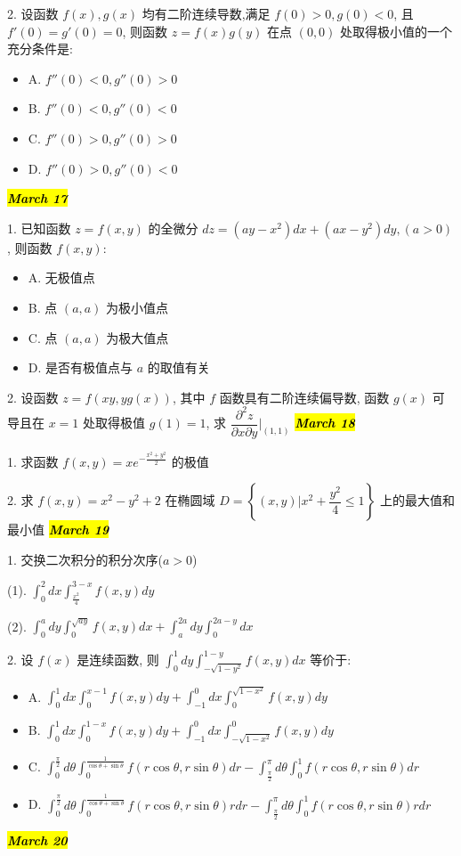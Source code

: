 2. 设函数 $f(x),g(x)$ 均有二阶连续导数,满足 $f(0)>0,g(0)<0$, 且 $f'(0)=g'(0)=0$, 则函数 $z=f(x)g(y)$ 在点 $(0,0)$ 处取得极小值的一个充分条件是:
\begin{itemize}
	\item A. $f''(0)<0,g''(0)>0$
	\item B. $f''(0)<0,g''(0)<0$
	\item C. $f''(0)>0,g''(0)>0$
	\item D. $f''(0)>0,g''(0)<0$
\end{itemize}
\hl{\textbf{\textit{March 17}}}

1. 已知函数 $z=f(x,y)$ 的全微分 $dz=(ay-x^{2})dx+(ax-y^{2})dy,(a>0)$, 则函数 $f(x,y)$:
\begin{itemize}
	\item A. 无极值点
	\item B. 点 $(a,a)$ 为极小值点
	\item C. 点 $(a,a)$ 为极大值点
	\item D. 是否有极值点与 $a$ 的取值有关
\end{itemize}

2. 设函数 $z=f(xy,yg(x))$, 其中 $f$ 函数具有二阶连续偏导数, 函数 $g(x)$ 可导且在 $x=1$ 处取得极值 $g(1)=1$, 求 $\dfrac{\partial^{2}z}{\partial x\partial y}|_{(1,1)}$
\hl{\textbf{\textit{March 18}}}

1. 求函数 $f(x,y)=xe^{-\frac{x^{2}+y^{2}}{2}}$ 的极值

2. 求 $f(x,y)=x^{2}-y^{2}+2$ 在椭圆域 $D=\left\lbrace (x,y)|x^{2}+\dfrac{y^{2}}{4}\leq 1\right\rbrace$ 上的最大值和最小值
\hl{\textbf{\textit{March 19}}}

1. 交换二次积分的积分次序($a>0$)

(1). $\int_{0}^{2}dx\int_{\frac{x^{2}}{4}}^{3-x}f(x,y)dy$

(2). $\int_{0}^{a}dy\int_{0}^{\sqrt{ay}}f(x,y)dx+\int_{a}^{2a}dy\int_{0}^{2a-y}dx$

2. 设 $f(x)$ 是连续函数, 则 $\int_{0}^{1}dy\int_{-\sqrt{1-y^{2}}}^{1-y}f(x,y)dx$ 等价于:
\begin{itemize}
	\item A. $\int_{0}^{1}dx\int_{0}^{x-1}f(x,y)dy+\int_{-1}^{0}dx\int_{0}^{\sqrt{1-x^{2}}}f(x,y)dy$
	\item B. $\int_{0}^{1}dx\int_{0}^{1-x}f(x,y)dy+\int_{-1}^{0}dx\int_{-\sqrt{1-x^{2}}}^{0}f(x,y)dy$
	\item C. $\int_{0}^{\frac{\pi}{2}}d\theta\int_{0}^{\frac{1}{\cos\theta+\sin\theta}}f(r\cos\theta,r\sin\theta)dr-\int_{\frac{\pi}{2}}^{\pi}d\theta\int_{0}^{1}f(r\cos\theta,r\sin\theta)dr$
	\item D. $\int_{0}^{\frac{\pi}{2}}d\theta\int_{0}^{\frac{1}{\cos\theta+\sin\theta}}f(r\cos\theta,r\sin\theta)rdr-\int_{\frac{\pi}{2}}^{\pi}d\theta\int_{0}^{1}f(r\cos\theta,r\sin\theta)rdr$
\end{itemize}
\hl{\textbf{\textit{March 20}}}

